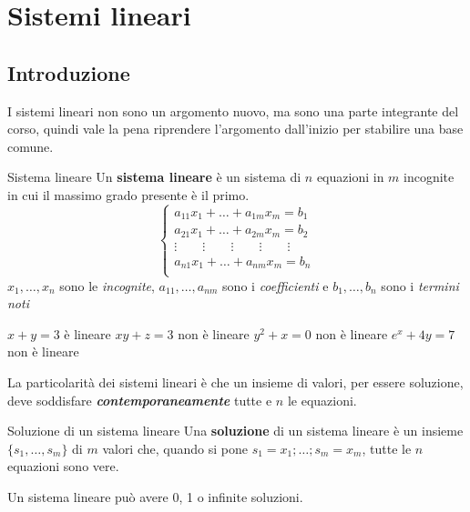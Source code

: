 \chapter{Sistemi lineari}
\section{Introduzione}
I sistemi lineari non sono un argomento nuovo, ma sono una parte integrante del corso, quindi vale la pena riprendere l'argomento dall'inizio per stabilire una base comune.
\begin{newdef}{Sistema lineare}
    Un \textbf{sistema lineare} è un sistema di $n$ equazioni in $m$ incognite in cui il massimo grado presente è il primo.
    \[
        \begin{cases}
            a_{11}x_{1} + \dots + a_{1m}x_{m} = b_1 \\
            a_{21}x_{1} + \dots + a_{2m}x_{m} = b_2 \\
            \vdots \quad\quad \vdots \quad\quad \vdots \quad\quad \vdots \quad\quad \vdots \\
            a_{n1}x_{1} + \dots + a_{nm}x_{m} = b_n \\  
        \end{cases}
    \]
    $x_1, \dots, x_n$ sono le \textit{incognite}, $a_{11}, \dots, a_{nm}$ sono i \textit{coefficienti} e $b_1, \dots, b_n$ sono i \textit{termini noti}
\end{newdef}
\begin{center}
    $x + y = 3$ è lineare \hspace{2cm} $xy + z = 3$ non è lineare \hspace{2cm} $y^2 + x = 0$ non è lineare \hspace{2cm} $e^x + 4y = 7$ non è lineare
\end{center}

La particolarità dei sistemi lineari è che un insieme di valori, per essere soluzione, deve soddisfare \textbf{\textit{contemporaneamente}} tutte e $n$ le equazioni.

\begin{newdef}{Soluzione di un sistema lineare}
    Una \textbf{soluzione} di un sistema lineare è un insieme $\{s_1, \dots, s_m\}$ di $m$ valori che, quando si pone $s_1 = x_1; \dots; s_m = x_m$, tutte le $n$ equazioni sono vere.

    Un sistema lineare può avere 0, 1 o infinite soluzioni.
\end{newdef}

